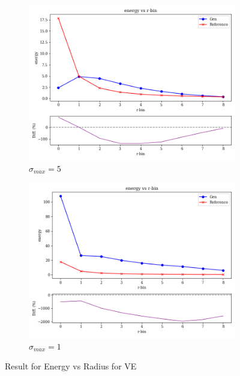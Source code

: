 \begin{figure}[bthp]
\begin{subfigure}[b]{0.23\textwidth}
        \centering
        \includegraphics[width=\textwidth]{Figures/ve5_2.png}
        \caption{$\sigma_{max}=5$}
        \label{fig:ve5_2}
    \end{subfigure}
    \hfill
    \begin{subfigure}[b]{0.23\textwidth}  %
        \centering
        \includegraphics[width=\textwidth]{Figures/ve1_2.png}
        \caption{$\sigma_{max}=1$}
        \label{fig:ve1_2}
    \end{subfigure}
    \caption{Result for Energy vs Radius for VE}
\end{figure}

